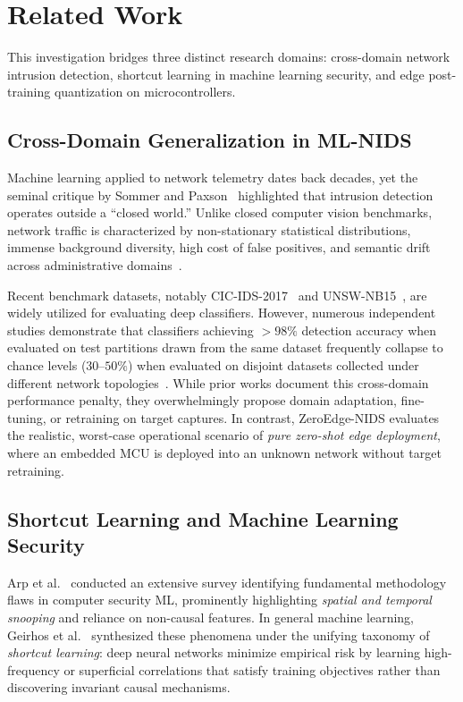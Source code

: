 \section{Related Work}
\label{sec:related}

This investigation bridges three distinct research domains: cross-domain network intrusion detection, shortcut learning in machine learning security, and edge post-training quantization on microcontrollers.

\subsection{Cross-Domain Generalization in ML-NIDS}
Machine learning applied to network telemetry dates back decades, yet the seminal critique by Sommer and Paxson~\cite{sommer2010outside} highlighted that intrusion detection operates outside a ``closed world.'' Unlike closed computer vision benchmarks, network traffic is characterized by non-stationary statistical distributions, immense background diversity, high cost of false positives, and semantic drift across administrative domains~\cite{ring2019survey}.

Recent benchmark datasets, notably CIC-IDS-2017~\cite{sharafaldin2018cicids} and UNSW-NB15~\cite{moustafa2015unsw}, are widely utilized for evaluating deep classifiers. However, numerous independent studies demonstrate that classifiers achieving $>98\%$ detection accuracy when evaluated on test partitions drawn from the same dataset frequently collapse to chance levels ($30\text{--}50\%$) when evaluated on disjoint datasets collected under different network topologies~\cite{sarhan2023standard, apruzzese2023role}. While prior works document this cross-domain performance penalty, they overwhelmingly propose domain adaptation, fine-tuning, or retraining on target captures. In contrast, ZeroEdge-NIDS evaluates the realistic, worst-case operational scenario of \emph{pure zero-shot edge deployment}, where an embedded MCU is deployed into an unknown network without target retraining.

\subsection{Shortcut Learning and Machine Learning Security}
Arp et al.~\cite{arp2022dos} conducted an extensive survey identifying fundamental methodology flaws in computer security ML, prominently highlighting \emph{spatial and temporal snooping} and reliance on non-causal features. In general machine learning, Geirhos et al.~\cite{geirhos2020shortcut} synthesized these phenomena under the unifying taxonomy of \emph{shortcut learning}: deep neural networks minimize empirical risk by learning high-frequency or superficial correlations that satisfy training objectives rather than discovering invariant causal mechanisms.

